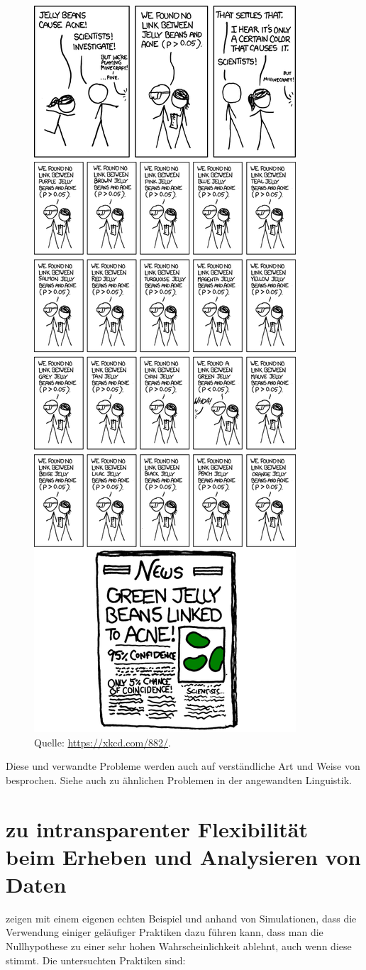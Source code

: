 \documentclass[oneside, 10pt]{book}\usepackage[]{graphicx}\usepackage[]{xcolor}
\begin{document}
\begin{figure}[htbp]
\begin{center}
\includegraphics[width = .5\textwidth]{figs/significant}
\caption{Quelle: \url{https://xkcd.com/882/}.}
\label{fig:xkcd_significant}
\end{center}
\end{figure}

Diese und verwandte Probleme werden auch auf verständliche
Art und Weise von \citet[][ursprünglich veröffentlicht auf Niederländisch im Jahr 1956; 3.5 Seiten Text + 3 Seiten Kommentar]{DeGroot2014} 
besprochen. Siehe auch \citet{Berthele2019} zu ähnlichen Problemen
in der angewandten Linguistik.

\section{\citet{Simmons2011} zu intransparenter Flexibilität beim Erheben und Analysieren von Daten}
\citet[][7 Seiten Text]{Simmons2011} zeigen mit einem
eigenen echten Beispiel und anhand von Simulationen, dass
die Verwendung einiger geläufiger Praktiken dazu führen
kann, dass man die Nullhypothese zu einer sehr hohen
Wahrscheinlichkeit ablehnt, auch wenn diese stimmt.
Die untersuchten Praktiken sind:
\end{document}
